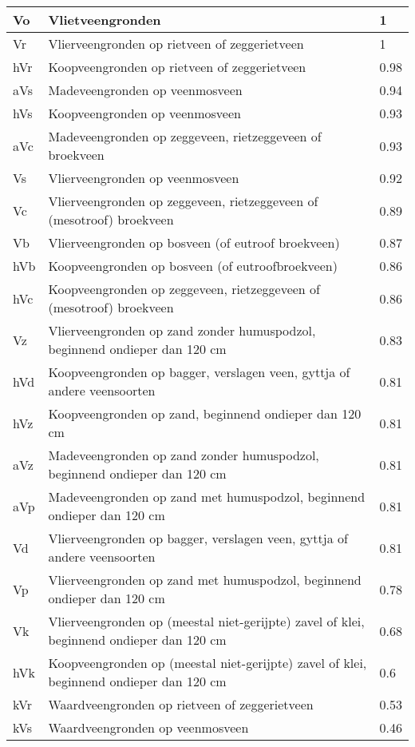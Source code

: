 \documentclass[12pt,a4paper,titlepage]{article}
\begin{document}
\begin{appendices}
\begin{center}
\begin{longtable}{|l| p{11cm} | l |}
Vo & Vlietveengronden  & 1 \\ \hline
Vr & Vlierveengronden op rietveen of zeggerietveen  & 1 \\ \hline
hVr & Koopveengronden op rietveen of zeggerietveen  & 0.98 \\ \hline
aVs & Madeveengronden op veenmosveen  & 0.94 \\ \hline
hVs & Koopveengronden op veenmosveen  & 0.93 \\ \hline
aVc & Madeveengronden op zeggeveen, rietzeggeveen of broekveen  & 0.93 \\ \hline
Vs & Vlierveengronden op veenmosveen  & 0.92 \\ \hline
Vc & Vlierveengronden op zeggeveen, rietzeggeveen of (mesotroof) broekveen  & 0.89 \\ \hline
Vb & Vlierveengronden op bosveen (of eutroof broekveen)  & 0.87 \\ \hline
hVb & Koopveengronden op bosveen (of eutroofbroekveen)  & 0.86 \\ \hline
hVc & Koopveengronden op zeggeveen, rietzeggeveen of (mesotroof) broekveen  & 0.86 \\ \hline
Vz & Vlierveengronden op zand zonder humuspodzol, beginnend ondieper dan 120 cm  & 0.83 \\ \hline
hVd & Koopveengronden op bagger, verslagen veen, gyttja of andere veensoorten  & 0.81 \\ \hline
hVz & Koopveengronden op zand, beginnend ondieper dan 120 cm  & 0.81 \\ \hline
aVz & Madeveengronden op zand zonder humuspodzol, beginnend ondieper dan 120 cm  & 0.81 \\ \hline
aVp & Madeveengronden op zand met humuspodzol, beginnend ondieper dan 120 cm  & 0.81 \\ \hline
Vd & Vlierveengronden op bagger, verslagen veen, gyttja of andere veensoorten & 0.81 \\ \hline
Vp & Vlierveengronden op zand met humuspodzol, beginnend ondieper dan 120 cm  & 0.78 \\ \hline
Vk & Vlierveengronden op (meestal niet-gerijpte) zavel of klei, beginnend ondieper dan 120 cm  & 0.68 \\ \hline
hVk & Koopveengronden op (meestal niet-gerijpte) zavel of klei, beginnend ondieper dan 120 cm  & 0.6 \\ \hline
kVr & Waardveengronden op rietveen of zeggerietveen  & 0.53 \\ \hline
kVs & Waardveengronden op veenmosveen  & 0.46 \\ \hline

\end{longtable}
\end{center}
\end{appendices}
\end{document}
